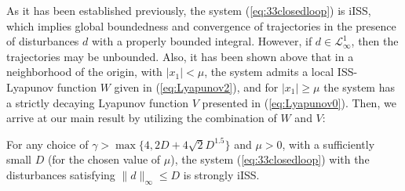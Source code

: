 \documentclass[letterpaper, 10 pt, conference]{ieeeconf}  %
\begin{document}
As it has been established previously, the system (\ref{eq:33closedloop})
is iISS, which implies global boundedness and convergence of trajectories
in the presence of disturbances $d$ with a properly bounded integral.
However, if $d\in\mathcal{L}_{\infty}^{1}$, then the trajectories
may be unbounded. Also, it has been shown above that in a neighborhood
of the origin, with $|x_{1}|<\mu$, the system admits a local ISS-Lyapunov
function $W$ given in (\ref{eq:Lyapunov2}), and for $|x_{1}|\geq\mu$
the system has a strictly decaying Lyapunov function $V$ presented
in (\ref{eq:Lyapunov0}). Then, we arrive at our main result by utilizing
the combination of $W$ and $V$:
\begin{theorem}
For any choice of $\gamma>\max\{4,2D+4\sqrt{2}D^{1.5}\}$ and $\mu>0$,
with a sufficiently small $D$ (for the chosen value of $\mu$), the system (\ref{eq:33closedloop})
with the disturbances satisfying $\|d\|_{\infty}\leq D$ is strongly
iISS.
\end{theorem}
\end{document}

